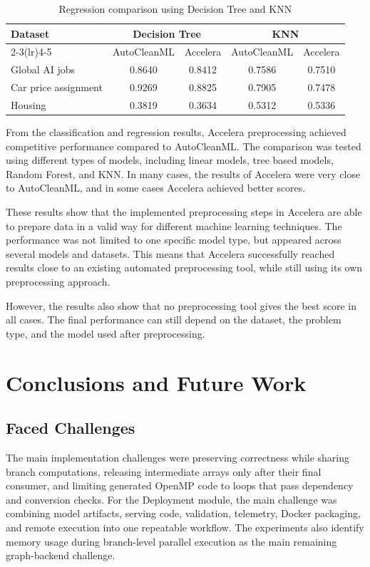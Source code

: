 \documentclass[12pt,a4paper]{report}
\newcommand{\acceleraTableStyle}{%
\small
\renewcommand{\arraystretch}{1.15}
\setlength{\tabcolsep}{4pt}%
}
\begin{document}
\begin{table}[H]
\centering
\acceleraTableStyle
\caption{Regression comparison using Decision Tree and KNN}
\label{tab:regression-dt-knn-autoclean-accelera}
\begin{tabular}{p{}cccc}
\toprule
Dataset & \multicolumn{2}{c}{Decision Tree} & \multicolumn{2}{c}{KNN} \\
\cmidrule(lr){2-3}\cmidrule(lr){4-5}
 & AutoCleanML & Accelera & AutoCleanML & Accelera \\
\midrule
Global AI jobs & 0.8640 & 0.8412 & 0.7586 & 0.7510 \\
Car price assignment & 0.9269 & 0.8825 & 0.7905 & 0.7478 \\
Housing & 0.3819 & 0.3634 & 0.5312 & 0.5336 \\
\bottomrule
\end{tabular}
\end{table}

\noindent From the classification and regression results, Accelera preprocessing achieved
competitive performance compared to AutoCleanML. The comparison was tested using
different types of models, including linear models, tree based models, Random
Forest, and KNN. In many cases, the results of Accelera were very close to
AutoCleanML, and in some cases Accelera achieved better scores.

\noindent These results show that the implemented preprocessing steps in Accelera are able
to prepare data in a valid way for different machine learning techniques. The
performance was not limited to one specific model type, but appeared across
several models and datasets. This means that Accelera successfully reached
results close to an existing automated preprocessing tool, while still using its
own preprocessing approach.

\noindent However, the results also show that no preprocessing tool gives the best score
in all cases. The final performance can still depend on the dataset, the problem
type, and the model used after preprocessing.

\chapter{Conclusions and Future Work}
\section{Faced Challenges}
The main implementation challenges were preserving correctness while sharing
branch computations, releasing intermediate arrays only after their final
consumer, and limiting generated OpenMP code to loops that pass dependency and
conversion checks. For the Deployment module, the main challenge was combining
model artifacts, serving code, validation, telemetry, Docker packaging, and
remote execution into one repeatable workflow. The experiments also identify
memory usage during branch-level parallel execution as the main remaining
graph-backend challenge.
\end{document}
